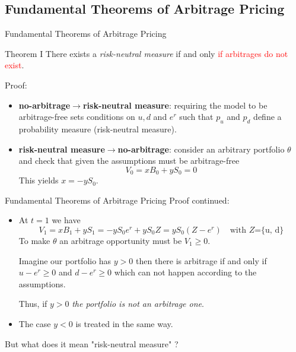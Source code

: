 \documentclass{beamer}
\begin{document}
\subsection{Fundamental Theorems of Arbitrage Pricing}
\begin{frame}{Fundamental Theorems of Arbitrage Pricing}
	\begin{block}{Theorem I}
		There exists a \emph{risk-neutral measure} if and only \textcolor{red}{if arbitrages do not exist}.
	\end{block}

	Proof:
	\begin{itemize}
	\item \textbf{no-arbitrage$\rightarrow$risk-neutral measure}: requiring the model to be arbitrage-free sets conditions on $u, d$ and $e^r$ such that $p_u$ and $p_d$ define a probability measure (risk-neutral measure).
	\item \textbf{risk-neutral measure$\rightarrow$no-arbitrage}: consider an arbitrary portfolio $\theta$ and check that given the assumptions must be arbitrage-free
	\begin{equation*}
		V_0 = xB_0 + yS_0 = 0
	\end{equation*}
	This yields $x = -yS_0$.
	\end{itemize}
\end{frame}

\begin{frame}{Fundamental Theorems of Arbitrage Pricing}
	Proof continued:
	\begin{itemize}
		\item At $t=1$ we have 
		\begin{equation*}
			V_1 = xB_1 + yS_1 = -yS_0e^r + yS_0Z = yS_0(Z - e^r)\quad\text{with $Z$=\{u, d\}}
		\end{equation*}
		To make $\theta$ an arbitrage opportunity must be $V_1\geq 0$.

		Imagine our portfolio has $y > 0$ then there is arbitrage if and only if $u - e^r \geq 0$ and $d - e^r \geq 0$
		which can not happen according to the assumptions. 

		Thus, if $y > 0$ \emph{the portfolio is not an arbitrage one}. 
		\item The case $y < 0$ is treated in the same way. 
	\end{itemize}

	\vspace{0.5cm}
	But what does it mean "risk-neutral measure" ?
\end{frame}
\end{document}
